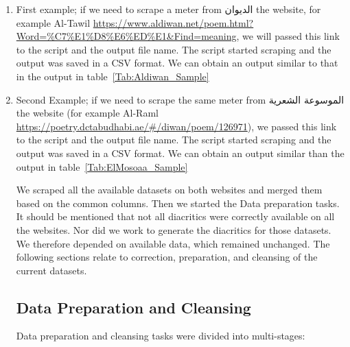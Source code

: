 \begin{enumerate}
 \item First example; if we need to scrape a meter from \textarabic{الديوان} the website, for example Al-Tawil \url{https://www.aldiwan.net/poem.html?Word=\%C7\%E1\%D8\%E6\%ED\%E1\&Find=meaning}, we will passed this link to the script and the output file name. The script started scraping and the output was saved in a CSV format. We can obtain an output similar to that in the output in table~\ref{Tab:Aldiwan_Sample}

 \item Second Example; if we need to scrape the same meter from \textarabic{الموسوعة الشعرية} the website (for example Al-Raml \url{https://poetry.dctabudhabi.ae/\#/diwan/poem/126971}), we passed this link to the script and the output file name. The script started scraping and the output was saved in a CSV format. We can obtain an output similar than the output in table~\ref{Tab:ElMosoaa_Sample}

We scraped all the available datasets on both websites and merged them based on the common columns. Then we started the Data preparation tasks. It should be mentioned that not all diacritics were correctly available on all the websites. Nor did we work to generate the diacritics for those datasets. We therefore depended on available data, which remained unchanged. The following sections relate to correction, preparation, and cleansing of the current datasets.

 \subsection{Data Preparation and Cleansing}\label{sec:Data_Clens}

Data preparation and cleansing tasks were divided into multi-stages:


\end{enumerate}
